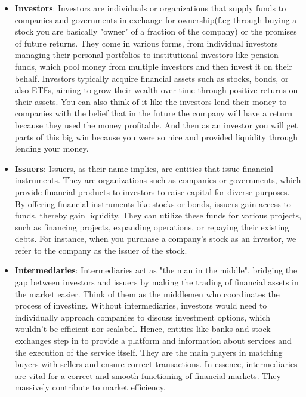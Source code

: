 \documentclass{article}
\begin{document}
\begin{itemize}
\item \textbf{Investors}:
Investors are individuals or organizations that supply funds to companies and governments in exchange for ownership(f.eg through buying a stock you are basically "owner" of a fraction of the company) or the promises of future returns. They come in various forms, from individual investors managing their personal portfolios to institutional investors like pension funds, which pool money from multiple investors and then invest it on their behalf. Investors typically acquire financial assets such as stocks, bonds, or also ETFs, aiming to grow their wealth over time through positive returns on their assets. You can also think of it like the investors lend their money to companies with the belief that in the future the company will have a return because they used the money profitable. And then as an investor you will get parts of this big win because you were so nice and provided liquidity through lending your money.

\item \textbf{Issuers}:
Issuers, as their name implies, are entities that issue financial instruments. They are organizations such as companies or governments, which provide financial products to investors to raise capital for diverse purposes. By offering financial instruments like stocks or bonds, issuers gain access to funds, thereby gain liquidity. They can utilize these funds for various projects, such as financing projects, expanding operations, or repaying their existing debts. For instance, when you purchase a company's stock as an investor, we refer to the company as the issuer of the stock.

\item \textbf{Intermediaries}:
Intermediaries act as "the man in the middle", bridging the gap between investors and issuers by making the trading of financial assets in the market easier. Think of them as the middlemen who coordinates the process of investing. Without intermediaries, investors would need to individually approach companies to discuss investment options, which wouldn't be  efficient nor scalabel. Hence, entities like banks and stock exchanges step in to provide a platform and information about services and the execution of the service itself. They are the main players in matching buyers with sellers and ensure correct transactions. In essence, intermediaries are vital for a correct and smooth functioning of financial markets. They massively contribute to market efficiency.


\end{itemize}
\end{document}

